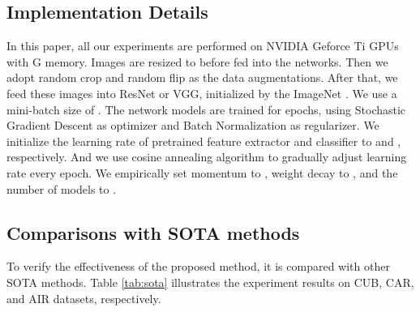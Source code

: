 \documentclass{article}
\begin{document}
\subsection{Implementation Details} 

In this paper, all our experiments are performed on  NVIDIA Geforce Ti GPUs with G memory. Images are resized to  before fed into the networks. Then we adopt random crop and random flip as the data augmentations. After that, we feed these images into ResNet or VGG, initialized by the ImageNet \cite{russakovsky2015imagenet}. We use a mini-batch size of . The network models are trained for  epochs, using Stochastic Gradient Descent as optimizer and Batch Normalization \cite{ioffe2015batch} as regularizer. We initialize the learning rate of pretrained feature extractor and classifier to  and , respectively. And we use cosine annealing algorithm \cite{loshchilov2016sgdr} to gradually adjust learning rate every epoch. We empirically set momentum to , weight decay to , and the number of models  to .
\subsection{Comparisons with SOTA methods}

To verify the effectiveness of the proposed method, it is compared with other SOTA methods. Table \ref{tab:sota} illustrates the experiment results on CUB, CAR, and AIR datasets, respectively.
\end{document}
